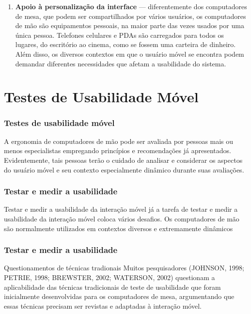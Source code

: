 \documentclass[presentation]{beamer}
\begin{document}
\begin{frame}[allowframebreaks]
\begin{enumerate}
        \item \textbf{Apoio à personalização da interface} --- diferentemente dos computadores de mesa, que podem ser compartilhados por vários usuários, os computadores de mão são equipamentos pessoais, na maior parte das vezes usados por uma única pessoa. Telefones celulares e PDAs são carregados para todos os lugares, do escritório ao cinema, como se fossem uma carteira de dinheiro. Além disso, os diversos contextos em que o usuário móvel se encontra podem demandar diferentes necessidades que afetam a usabilidade do sistema.
    \end{enumerate}

\end{frame}






\section{Testes de Usabilidade Móvel} %
\label{sec:testes_de_usabilidade_movel}

\begin{frame}[c]\frametitle{Testes de usabilidade móvel}
    
    \begin{block}{A ergonomia de computadores de mão}
        pode ser avaliada por pessoas mais ou menos especialistas empregando princípios e recomendações já apresentados. Evidentemente, tais pessoas terão o cuidado de analisar e considerar os aspectos do usuário móvel e seu contexto especialmente dinâmico durante suas avaliações.
    \end{block}

\end{frame}

\begin{frame}[c]\frametitle{Testar e medir a usabilidade}
    
    \begin{block}{Testar e medir a usabilidade da interação móvel}
        já a tarefa de testar e medir a usabilidade da interação móvel coloca vários desafios. Os computadores de mão são normalmente utilizados em contextos diversos e extremamente dinâmicos
    \end{block}

\end{frame}

\begin{frame}[c]\frametitle{Testar e medir a usabilidade}
    
    \begin{block}{Questionamentos de técnicas tradionais}
        Muitos pesquisadores (JOHNSON, 1998; PETRIE, 1998; BREWSTER, 2002; WATERSON, 2002) questionam a aplicabilidade das técnicas tradicionais de teste de usabilidade que foram inicialmente desenvolvidas para os computadores de mesa, argumentando que essas técnicas precisam ser revistas e adaptadas à interação móvel.
    \end{block}
\end{frame}
\end{document}
